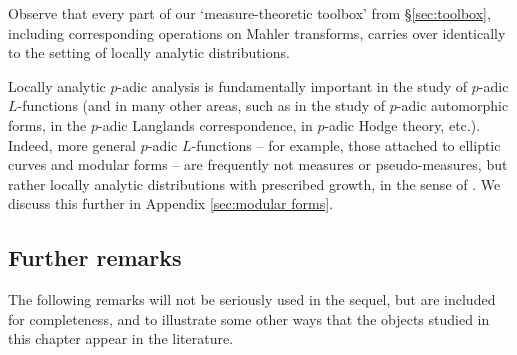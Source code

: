 \documentclass[a4paper,10pt, english, reqno]{smfart}
\numberwithin{equation}{section}
\begin{document}
\begin{remark} \label{rem:distribution toolbox}
Observe that every part of our `measure-theoretic toolbox' from \S\ref{sec:toolbox}, including corresponding operations on Mahler transforms, carries over identically to the setting of locally analytic distributions.
\end{remark}
\begin{remark}
Locally analytic $p$-adic analysis is fundamentally important in the study of $p$-adic $L$-functions (and in many other areas, such as in the study of $p$-adic automorphic forms, in the $p$-adic Langlands correspondence, in $p$-adic Hodge theory, etc.). Indeed, more general $p$-adic $L$-functions -- for example, those attached to elliptic curves and modular forms -- are frequently not measures or pseudo-measures, but rather locally analytic distributions with prescribed growth, in the sense of \cite{AV75}. We discuss this further in Appendix \ref{sec:modular forms}.
\end{remark}



\subsection{Further remarks}


	
	The following remarks will not be seriously used in the sequel, but are included for completeness, and to illustrate some other ways that the objects studied in this chapter appear in the literature.
	
\end{document}
